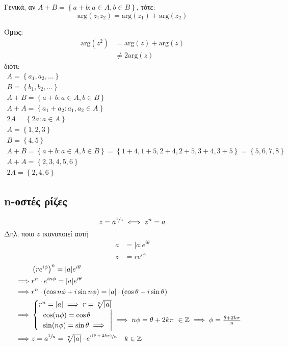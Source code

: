 \documentclass[12pt,a4paper,notitlepage,fleqn]{article}
\begin{document}
    Γενικά, αν \( A+B = \left\lbrace a+b: a \in A, b \in B \right\rbrace \), τότε:
    \[
    \mathrm{arg}(z_1z_2) = \mathrm{arg}(z_1) + \mathrm{arg}(z_2)
    \]

    Όμως:
    \begin{align*}
    \mathrm{arg}(z^2) &= \mathrm{arg}(z)+\mathrm{arg}(z) \\
    &\neq 2\mathrm{arg}(z)
    \end{align*}
    διότι:
    \begin{gather*}
    	A = \left\lbrace a_1,a_2,\dots \right\rbrace \\
    	B = \left\lbrace b_1,b_2,\dots \right\rbrace \\
    	A+B = \left\lbrace a+b: a\in A, b\in B \right\rbrace \\
    	A+A = \left\lbrace a_1+a_2:a_1,a_2\in A \right\rbrace \\
    	2A = \left\lbrace 2a:a\in A \right\rbrace \\[.3pt]
    	A = \left\lbrace 1,2,3 \right\rbrace \\
    	B = \left\lbrace 4,5 \right\rbrace \\
    	A+B = \left\lbrace a+b:a\in A, b\in B \right\rbrace
    	= \left\lbrace 1+4,1+5,2+4,2+5,3+4,3+5 \right\rbrace
    	= \left\lbrace 5,6,7,8 \right\rbrace\\
    	A+A = \left\lbrace 2,3,4,5,6 \right\rbrace \\
    	2A = \left\lbrace 2,4,6 \right\rbrace
    \end{gather*}


   	\subsection{n-οστές ρίζες}
   	\[
   	z = a^{\sfrac{1}{n}} \iff z^n=a
   	\]
   	Δηλ. ποιο \( z \) ικανοποιεί αυτή
   	\begin{align*}
   	a &= |a|e^{i\theta} \\
   	z &= re^{i\phi}
   	\end{align*}
   	\begin{align*}
   	& \left( re^{i\phi} \right)^n = |a|e^{i\theta} \\
   	\implies& r^n\cdot e ^{in\phi} = |a|e^{i\theta} \\
   	\implies& r^n\cdot(\cos n\phi+i\sin n\phi) = |a|\cdot(\cos\theta+i\sin\theta)\\
   	\implies& \begin{cases}
   	r^n=|a|\implies r =\sqrt[n]{|a|} \\
   	\left.\begin{array}{l}
   	\cos(n\phi)=\cos\theta \\
   	\sin(n\phi)=\sin\theta \implies
   	\end{array}\right| \implies
   	n\phi = \theta+2k\pi \ \in\mathbb Z \implies \phi=\frac{\theta+2k\pi}{n}
   	\end{cases} \\
   	\implies& z=a^{\sfrac{1}{n}} = \sqrt[n]{|a|}\cdot
   	e^{\sfrac{i(\theta+2k\pi)}{n}} \quad k\in\mathbb Z
   	\end{align*}
\end{document}
